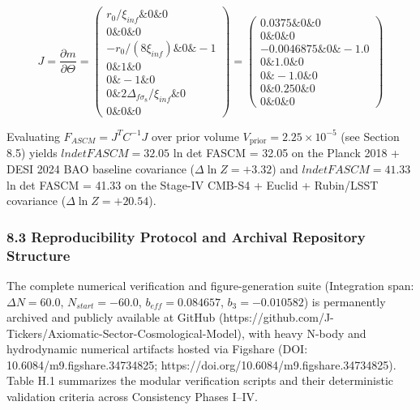 \documentclass[aps,prd,onecolumn,superscriptaddress,nofootinbib,longbibliography,10pt]{revtex4-2}
\begin{document}
\[J = \frac{\partial m}{\partial \Theta} = \begin{pmatrix}
r_0/\xi_{inf} \& 0 \& 0 \\[4pt]
0 \& 0 \& 0 \\[4pt]
-r_0/(8\xi_{inf}) \& 0 \& -1 \\[4pt]
0 \& 1 \& 0 \\[4pt]
0 \& -1 \& 0 \\[4pt]
0 \& 2\Delta_{f\sigma_8}/\xi_{inf} \& 0 \\[4pt]
0 \& 0 \& 0
\end{pmatrix} = \begin{pmatrix}
0.0375 \& 0 \& 0 \\[4pt]
0 \& 0 \& 0 \\[4pt]
-0.0046875 \& 0 \& -1.0 \\[4pt]
0 \& 1.0 \& 0 \\[4pt]
0 \& -1.0 \& 0 \\[4pt]
0 \& \mathbf{0.250} \& 0 \\[4pt]
0 \& 0 \& 0
\end{pmatrix}\]



Evaluating \(F_{ASCM} = J^T C^{-1} J\) over prior volume \(V_{\text{prior}} = 2.25 \times 10^{-5}\) (see Section 8.5) yields $ln det FASCM = 32.05$ ln det FASCM = 32.05 on the Planck 2018 + DESI 2024 BAO baseline covariance (\(\Delta\ln Z = +3.32\)) and $ln det FASCM = 41.33$ ln det FASCM = 41.33 on the Stage-IV CMB-S4 + Euclid + Rubin/LSST covariance (\(\Delta\ln Z = +20.54\)).



  
\subsubsection*{8.3 Reproducibility Protocol and Archival Repository Structure}

  The complete numerical verification and figure-generation suite (Integration span: \(\Delta N = 60.0\), \(N_{start} = -60.0\), \(b_{eff} = 0.084657\), \(b_3 = -0.010582\)) is permanently archived and publicly available at GitHub (https://github.com/J-Tickers/Axiomatic-Sector-Cosmological-Model), with heavy N-body and hydrodynamic numerical artifacts hosted via Figshare (DOI: 10.6084/m9.figshare.34734825; https://doi.org/10.6084/m9.figshare.34734825). Table H.1 summarizes the modular verification scripts and their deterministic validation criteria across Consistency Phases I–IV.
\end{document}
